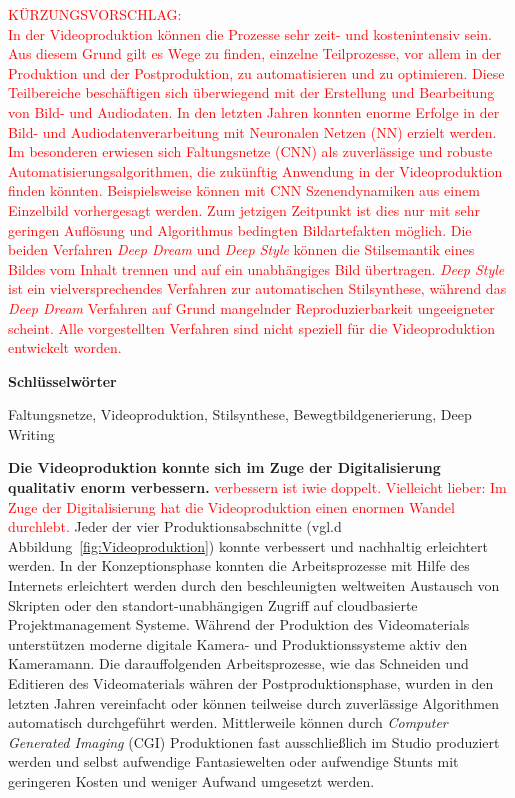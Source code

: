 \documentclass[times, 11pt,twocolumn]{article}
\begin{document}
\textcolor{red}{KÜRZUNGSVORSCHLAG: \\
In der Videoproduktion können die Prozesse sehr zeit- und kostenintensiv sein. Aus diesem Grund gilt es Wege zu finden, einzelne Teilprozesse, vor allem in der Produktion und der Postproduktion, zu automatisieren und zu optimieren. Diese Teilbereiche beschäftigen sich überwiegend mit der Erstellung und Bearbeitung von Bild- und Audiodaten. In den letzten Jahren konnten enorme Erfolge in der Bild- und Audiodatenverarbeitung mit Neuronalen Netzen (NN) erzielt werden. Im besonderen erwiesen sich Faltungsnetze (CNN) als zuverlässige und robuste Automatisierungsalgorithmen, die zukünftig Anwendung in der Videoproduktion finden könnten. 
Beispielsweise können mit CNN Szenendynamiken aus einem Einzelbild vorhergesagt werden. Zum jetzigen Zeitpunkt ist dies nur mit sehr geringen Auflösung und Algorithmus bedingten Bildartefakten möglich. Die beiden Verfahren \textit{Deep Dream} und \textit{Deep Style} können die Stilsemantik eines Bildes vom Inhalt trennen und auf ein unabhängiges Bild übertragen. \textit{Deep Style} ist ein vielversprechendes Verfahren zur automatischen Stilsynthese, während das \textit{Deep Dream} Verfahren auf Grund mangelnder Reproduzierbarkeit ungeeigneter scheint. Alle vorgestellten Verfahren sind nicht speziell für die Videoproduktion entwickelt worden.}


\large{\textbf{Schl\"usselw\"orter}}\\ \small %

 Faltungsnetze, Videoproduktion, Stilsynthese, Bewegtbildgenerierung, Deep Writing



 \label{sec:Einleitung}
\textbf{Die Videoproduktion konnte sich im Zuge der Digitalisierung qualitativ enorm verbessern.} \textcolor{red}{verbessern ist iwie doppelt. Vielleicht lieber: Im Zuge der Digitalisierung hat die Videoproduktion einen enormen Wandel durchlebt. }Jeder der vier Produktionsabschnitte (vgl.d Abbildung~\ref{fig:Videoproduktion}) konnte verbessert und nachhaltig erleichtert werden. In der Konzeptionsphase konnten die Arbeitsprozesse mit Hilfe des Internets erleichtert werden durch den beschleunigten weltweiten Austausch von Skripten oder den standort-unabhängigen Zugriff auf cloudbasierte Projektmanagement Systeme. Während der Produktion des Videomaterials unterstützen moderne digitale Kamera- und Produktionssysteme aktiv den Kameramann. Die darauffolgenden Arbeitsprozesse, wie das Schneiden und Editieren des Videomaterials währen der Postproduktionsphase, wurden in den letzten Jahren vereinfacht oder können teilweise durch zuverlässige Algorithmen automatisch durchgeführt werden. Mittlerweile können durch \textit{Computer Generated Imaging} (CGI) Produktionen fast ausschließlich im Studio produziert werden und selbst aufwendige Fantasiewelten oder aufwendige Stunts mit geringeren Kosten und weniger Aufwand umgesetzt werden.
\end{document}
